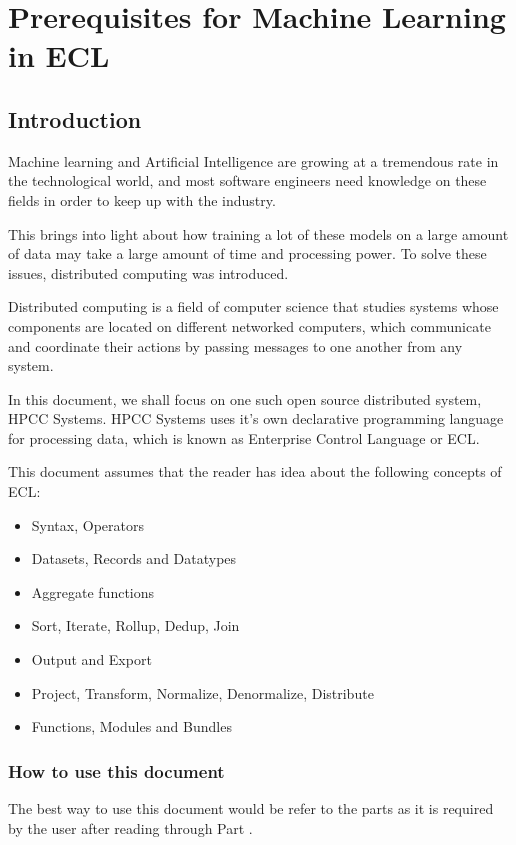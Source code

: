 \part{Prerequisites for Machine Learning in ECL}\label{part:prereqs}

\chapter{Introduction}\label{chap:intro}

Machine learning and Artificial Intelligence are growing at a tremendous rate in the technological world, and most software engineers need knowledge on these fields in order to keep up with the industry.

This brings into light about how training a lot of these models on a large amount of data may take a large amount of time and processing power. To solve these issues, distributed computing was introduced.

Distributed computing is a field of computer science that studies systems whose components are located on different networked computers, which communicate and coordinate their actions by passing messages to one another from any system.

In this document, we shall focus on one such open source distributed system, HPCC Systems. HPCC Systems uses it's own declarative programming language for processing data, which is known as Enterprise Control Language or ECL.

This document assumes that the reader has idea about the following concepts of ECL:
\begin{itemize}
    \item Syntax, Operators
    \item Datasets, Records and Datatypes
    \item Aggregate functions
    \item Sort, Iterate, Rollup, Dedup, Join
    \item Output and Export
    \item Project, Transform, Normalize, Denormalize, Distribute
    \item Functions, Modules and Bundles
\end{itemize}

\section{How to use this document}\label{sec:howtouse}

The best way to use this document would be refer to the parts as it is required by the user after reading through Part \ref{part:prereqs}.

